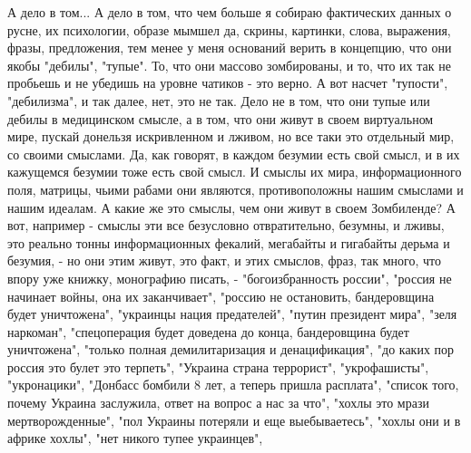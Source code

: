 А дело в том... А дело в том, что чем больше я собираю фактических данных о
русне, их психологии, образе мымшел да, скрины, картинки, слова, выражения,
фразы, предложения, тем менее у меня оснований верить в концепцию, что они
якобы "дебилы", "тупые". То, что они массово зомбированы, и то, что их так не
пробьешь и не убедишь на уровне чатиков - это верно. А вот насчет "тупости",
"дебилизма", и так далее, нет, это не так. Дело не в том, что они тупые или
дебилы в медицинском смысле, а в том, что они живут в своем виртуальном мире,
пускай донельзя искривленном и лживом, но все таки это отдельный мир, со своими
смыслами. Да, как говорят, в каждом безумии есть свой смысл, и в их кажущемся
безумии тоже есть свой смысл. И смыслы их мира, информационного поля, матрицы,
чьими рабами они являются, противоположны нашим смыслами и нашим идеалам. А
какие же это смыслы, чем они живут в своем Зомбиленде?  А вот, например -
смыслы эти все безусловно отвратительно, безумны, и лживы, это реально тонны
информационных фекалий, мегабайты и гигабайты дерьма и безумия, - но они этим
живут, это факт, и этих смыслов, фраз, так много, что впору уже книжку,
монографию писать, - "богоизбранность россии", "россия не начинает войны, она
их заканчивает", "россию не остановить, бандеровщина будет уничтожена",
"украинцы нация предателей", "путин президент мира", "зеля наркоман",
"спецоперация будет доведена до конца, бандеровщина будет уничтожена", "только
полная демилитаризация и денацификация", "до каких пор россия это булет это
терпеть", "Украина страна террорист", "укрофашисты", "укронацики", "Донбасс
бомбили 8 лет, а теперь пришла расплата", "список того, почему Украина
заслужила, ответ на вопрос а нас за что", "хохлы это мрази мертворожденные",
"пол Украины потеряли и еще выебываетесь", "хохлы они и в африке хохлы", "нет
никого тупее украинцев",









